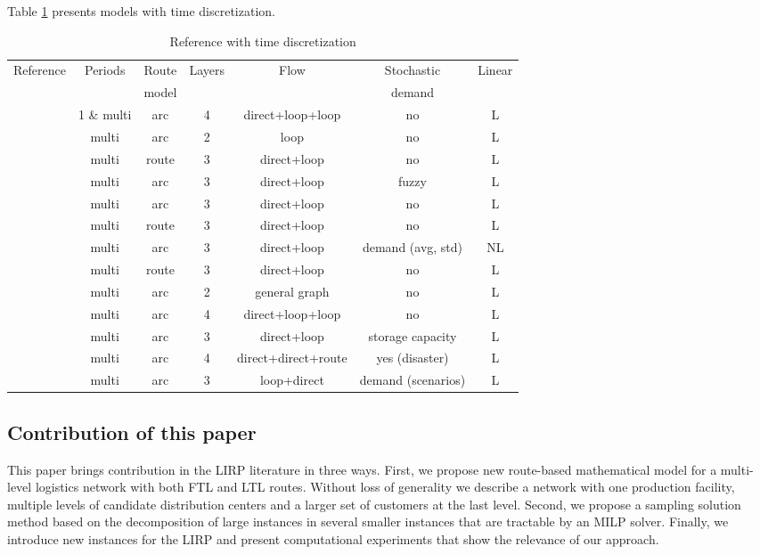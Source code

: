\documentclass[a4paper,10pt]{article}
\begin{document}
\begin{linenumbers}
Table \ref{tab2} presents models with time discretization. 

\begin{table}[htbp]
	\scriptsize
	\begin{tabular}{lcccccc}
		\toprule
		Reference & Periods & Route & Layers   & Flow &  Stochastic & Linear  \\
					&          & model & 	   & 	   &     demand        &                      \\
		\midrule
\cite{AmbScu05}			&	1 \& multi	&	arc		&	4 	&	direct+loop+loop	&	no	&	L		\\
\cite{Zhang2014}		&	multi		&	arc  	&	2 	&	loop				&	no	&	L	\\
\cite{Guerrero2013}		&	multi		&	route	&	3 	&	direct+loop			&	no	&	L	\\
\cite{TavakkoliIFAC2016}&	multi		&	arc		&	3 	&	direct+loop			&	fuzzy 	&	L	\\
\cite{Ghorbani2016}		&	multi		&	arc		&	3 	&	direct+loop			&	no	&	L\\
\cite{Lehrlaly2016}		&	multi		&	route	&	3 	&	direct+loop			&	no	&	L		\\
\cite{Rayat2017}		&	multi		&	arc		&	3 	&	direct+loop			&	demand (avg, std)	&	NL		\\
\cite{Hiassat2017}		&	multi		&	route	&	3 	&	direct+loop			&	no	&	L		\\
\cite{Riquelme2016}		&	multi		&	arc		&	2 	&	general graph		&	no	&	L	\\
\cite{Tavana2018} 		&	multi		&	arc		&	4 	&	direct+loop+loop 	&	no	&	L		\\
\cite{Vahdani2018}		&	multi		&	arc		&	3 	&	direct+loop			&	storage capacity	&	L	\\
\cite{Eskandari2018}	&	multi		&	arc		&	4 	&	direct+direct+route	&	yes (disaster)	&	L		\\
\cite{Bashiri2018}		&	multi		&	arc		&	3 	&	loop+direct			&	demand (scenarios)	&	L	\\
		\bottomrule
	\end{tabular}
	\caption{Reference with time discretization}
	\label{tab2}
\end{table}




\subsection{Contribution of this paper}

This paper brings contribution in the LIRP literature in three ways. 
First, we propose new route-based mathematical model for a multi-level logistics network with both FTL and LTL routes. 
Without loss of generality we describe a network with one production facility, multiple levels of candidate distribution centers 
and a larger set of customers at the last level. 
Second, we propose a sampling solution method based on the decomposition of large instances in several smaller instances that are tractable by an MILP solver. 
Finally, we introduce new instances for the LIRP and present computational experiments that show the relevance of our approach. 


\end{linenumbers}
\end{document}
